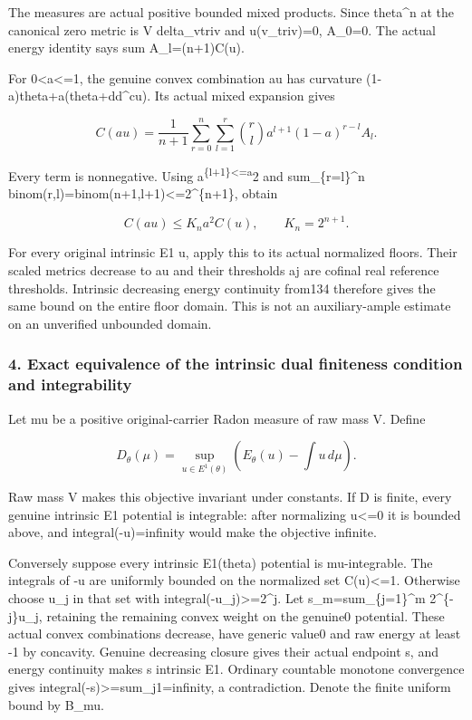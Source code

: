 \documentclass[
]{article}
\begin{document}
The measures are actual positive bounded mixed products. Since
theta\^{}n at the canonical zero metric is V delta\_vtriv and
u(v\_triv)=0, A\_0=0. The actual energy identity says sum
A\_l=(n+1)C(u).

For 0\textless a\textless=1, the genuine convex combination au has
curvature (1-a)theta+a(theta+dd\^{}cu). Its actual mixed expansion gives

\[C(au)=\frac1{n+1}\sum_{r=0}^n\sum_{l=1}^r
\binom rl a^{l+1}(1-a)^{r-l}A_l.\]

Every term is nonnegative. Using a\textsuperscript{\{l+1\}\textless=a}2
and sum\_\{r=l\}\^{}n binom(r,l)=binom(n+1,l+1)\textless=2\^{}\{n+1\},
obtain

\[C(au)\le K_n a^2 C(u),\qquad K_n=2^{n+1}.\]

For every original intrinsic E1 u, apply this to its actual normalized
floors. Their scaled metrics decrease to au and their thresholds aj are
cofinal real reference thresholds. Intrinsic decreasing energy
continuity from134 therefore gives the same bound on the entire floor
domain. This is not an auxiliary-ample estimate on an unverified
unbounded domain.

\subsubsection{4. Exact equivalence of the intrinsic dual finiteness
condition and
integrability}\label{exact-equivalence-of-the-intrinsic-dual-finiteness-condition-and-integrability}

Let mu be a positive original-carrier Radon measure of raw mass V.
Define

\[D_\theta(\mu)=\sup_{u\in E^1(\theta)}
\left(E_\theta(u)-\int u\,d\mu\right).\]

Raw mass V makes this objective invariant under constants. If D is
finite, every genuine intrinsic E1 potential is integrable: after
normalizing u\textless=0 it is bounded above, and integral(-u)=infinity
would make the objective infinite.

Conversely suppose every intrinsic E1(theta) potential is mu-integrable.
The integrals of -u are uniformly bounded on the normalized set
C(u)\textless=1. Otherwise choose u\_j in that set with
integral(-u\_j)\textgreater=2\^{}j. Let s\_m=sum\_\{j=1\}\^{}m
2\^{}\{-j\}u\_j, retaining the remaining convex weight on the genuine0
potential. These actual convex combinations decrease, have generic
value0 and raw energy at least -1 by concavity. Genuine decreasing
closure gives their actual endpoint s, and energy continuity makes s
intrinsic E1. Ordinary countable monotone convergence gives
integral(-s)\textgreater=sum\_j1=infinity, a contradiction. Denote the
finite uniform bound by B\_mu.
\end{document}
